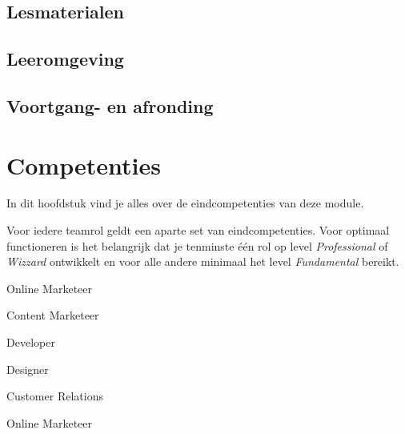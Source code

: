 \documentclass[]{book}
\begin{document}
\section{Lesmaterialen}\label{lesmaterialen}

\section{Leeromgeving}\label{leeromgeving}

\section{Voortgang- en afronding}\label{voortgang--en-afronding}

\chapter{Competenties}\label{competenties}

In dit hoofdstuk vind je alles over de eindcompetenties van deze module.

Voor iedere teamrol geldt een aparte set van eindcompetenties. Voor
optimaal functioneren is het belangrijk dat je tenminste één rol op
level \emph{Professional} of \emph{Wizzard} ontwikkelt en voor alle
andere minimaal het level \emph{Fundamental} bereikt.

Online Marketeer

Content Marketeer

Developer

Designer

Customer Relations

Online Marketeer
\end{document}
